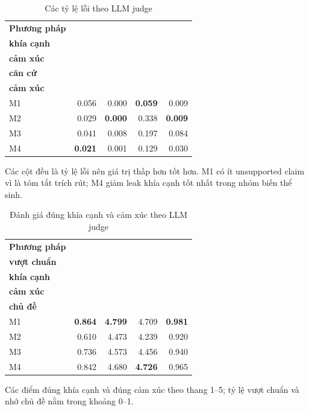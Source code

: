 \documentclass[12pt,a4paper]{report}
\begin{document}
\begin{table}[tbp]
\centering
\caption{Các tỷ lệ lỗi theo LLM judge}
\label{tab:judge-errors}
\begin{threeparttable}
\begin{tabular}{l r r r r}
\toprule
\textbf{Phương pháp} & \makecell{\textbf{Leak}\\\textbf{khía cạnh}} & \makecell{\textbf{Leak}\\\textbf{cảm xúc}} & \makecell{\textbf{Không}\\\textbf{căn cứ}} & \makecell{\textbf{Lật}\\\textbf{cảm xúc}} \\
\midrule
M1 & \num{0.056} & \num{0.000} & \textbf{\num{0.059}} & \num{0.009} \\
M2 & \num{0.029} & \textbf{\num{0.000}} & \num{0.338} & \textbf{\num{0.009}} \\
M3 & \num{0.041} & \num{0.008} & \num{0.197} & \num{0.084} \\
M4 & \textbf{\num{0.021}} & \num{0.001} & \num{0.129} & \num{0.030} \\
\bottomrule
\end{tabular}
\begin{tablenotes}
\footnotesize
\item Các cột đều là tỷ lệ lỗi nên giá trị thấp hơn tốt hơn. M1 có ít unsupported claim vì là tóm tắt trích rút; M4 giảm leak khía cạnh tốt nhất trong nhóm biến thể sinh.
\end{tablenotes}
\end{threeparttable}
\end{table}

\begin{table}[tbp]
\centering
\caption{Đánh giá đúng khía cạnh và cảm xúc theo LLM judge}
\label{tab:summary-utility}
\begin{threeparttable}
\begin{tabular}{l r r r r}
\toprule
\textbf{Phương pháp} & \makecell{\textbf{Tỷ lệ}\\\textbf{vượt chuẩn}} & \makecell{\textbf{Đúng}\\\textbf{khía cạnh}} & \makecell{\textbf{Đúng}\\\textbf{cảm xúc}} & \makecell{\textbf{Nhớ}\\\textbf{chủ đề}} \\
\midrule
M1 & \textbf{\num{0.864}} & \textbf{\num{4.799}} & \num{4.709} & \textbf{\num{0.981}} \\
M2 & \num{0.610} & \num{4.473} & \num{4.239} & \num{0.920} \\
M3 & \num{0.736} & \num{4.573} & \num{4.456} & \num{0.940} \\
M4 & \num{0.842} & \num{4.680} & \textbf{\num{4.726}} & \num{0.965} \\
\bottomrule
\end{tabular}
\begin{tablenotes}
\footnotesize
\item Các điểm đúng khía cạnh và đúng cảm xúc theo thang 1--5; tỷ lệ vượt chuẩn và nhớ chủ đề nằm trong khoảng 0--1.
\end{tablenotes}
\end{threeparttable}
\end{table}
\end{document}
